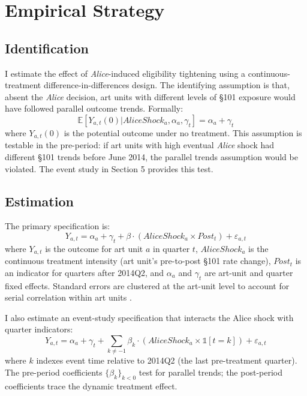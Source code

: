 \documentclass[12pt]{article}
\newcommand{\E}{\mathbb{E}}
\newcommand{\ind}{\mathbb{1}}
\begin{document}



\section{Empirical Strategy}

\subsection{Identification}

I estimate the effect of \textit{Alice}-induced eligibility tightening using a continuous-treatment difference-in-differences design. The identifying assumption is that, absent the \textit{Alice} decision, art units with different levels of \S101 exposure would have followed parallel outcome trends. Formally:
\begin{equation}
\E[Y_{a,t}(0) | AliceShock_a, \alpha_a, \gamma_t] = \alpha_a + \gamma_t
\label{eq:parallel}
\end{equation}
where $Y_{a,t}(0)$ is the potential outcome under no treatment. This assumption is testable in the pre-period: if art units with high eventual \textit{Alice} shock had different \S101 trends before June 2014, the parallel trends assumption would be violated. The event study in Section 5 provides this test.

\subsection{Estimation}

The primary specification is:
\begin{equation}
Y_{a,t} = \alpha_a + \gamma_t + \beta \cdot (AliceShock_a \times Post_t) + \varepsilon_{a,t}
\label{eq:main}
\end{equation}
where $Y_{a,t}$ is the outcome for art unit $a$ in quarter $t$, $AliceShock_a$ is the continuous treatment intensity (art unit's pre-to-post \S101 rate change), $Post_t$ is an indicator for quarters after 2014Q2, and $\alpha_a$ and $\gamma_t$ are art-unit and quarter fixed effects. Standard errors are clustered at the art-unit level to account for serial correlation within art units \citep{callawaysantanna2021, roth2023}.

I also estimate an event-study specification that interacts the Alice shock with quarter indicators:
\begin{equation}
Y_{a,t} = \alpha_a + \gamma_t + \sum_{k \neq -1} \beta_k \cdot (AliceShock_a \times \ind[t = k]) + \varepsilon_{a,t}
\label{eq:eventstudy}
\end{equation}
where $k$ indexes event time relative to 2014Q2 (the last pre-treatment quarter). The pre-period coefficients $\{\beta_k\}_{k < 0}$ test for parallel trends; the post-period coefficients trace the dynamic treatment effect.
\end{document}
